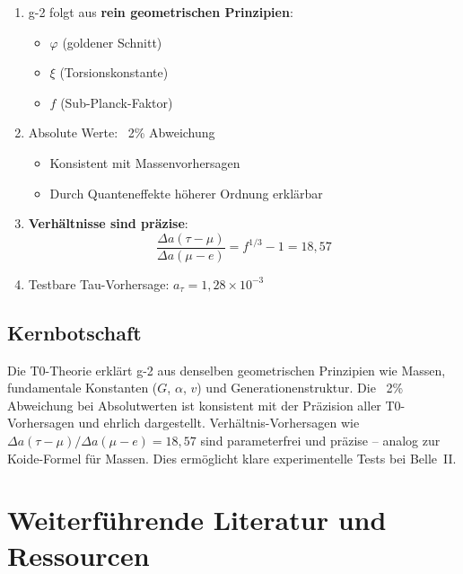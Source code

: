 	\begin{enumerate}
		\item g-2 folgt aus \textbf{rein geometrischen Prinzipien}:
		\begin{itemize}
			\item $\varphi$ (goldener Schnitt)
			\item $\xi$ (Torsionskonstante)
			\item $f$ (Sub-Planck-Faktor)
		\end{itemize}
		
		\item Absolute Werte: ~2\% Abweichung
		\begin{itemize}
			\item Konsistent mit Massenvorhersagen
			\item Durch Quanteneffekte höherer Ordnung erklärbar
		\end{itemize}
		
		\item \textbf{Verhältnisse sind präzise}:
		\begin{equation}
			\frac{\Delta a(\tau - \mu)}{\Delta a(\mu - e)} = f^{1/3} - 1 = 18{,}57
		\end{equation}
		
		\item Testbare Tau-Vorhersage: $a_\tau = 1{,}28 \times 10^{-3}$
	\end{enumerate}
	
	\subsection{Kernbotschaft}
	
	\begin{keypoint}
		Die T0-Theorie erklärt g-2 aus denselben geometrischen Prinzipien wie Massen, fundamentale Konstanten ($G$, $\alpha$, $v$) und Generationenstruktur. Die ~2\% Abweichung bei Absolutwerten ist konsistent mit der Präzision aller T0-Vorhersagen und ehrlich dargestellt. Verhältnis-Vorhersagen wie $\Delta a(\tau - \mu) / \Delta a(\mu - e) = 18{,}57$ sind parameterfrei und präzise -- analog zur Koide-Formel für Massen. Dies ermöglicht klare experimentelle Tests bei Belle~II.
	\end{keypoint}
	
	\section*{Weiterführende Literatur und Ressourcen}
	

